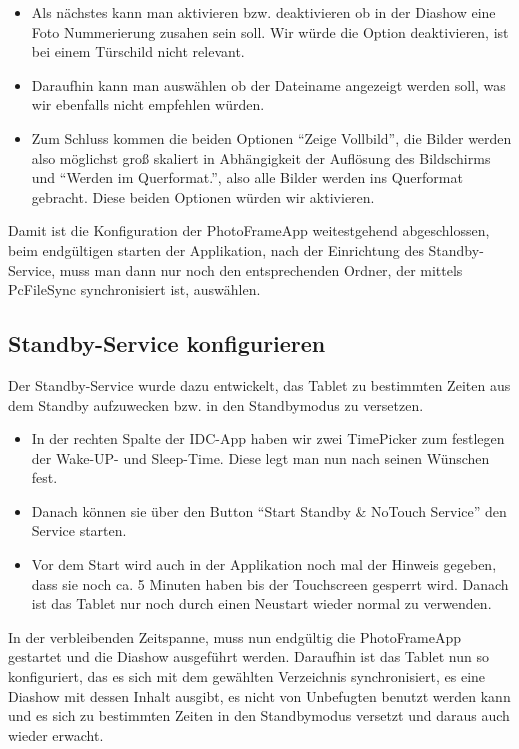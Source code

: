 \begin{flushleft}
\begin{itemize}
\begin{itemize}
        \item Als nächstes kann man aktivieren bzw. deaktivieren ob in der Diashow eine Foto Nummerierung zusahen sein soll. Wir würde die Option deaktivieren, ist bei einem Türschild nicht relevant.
        \item Daraufhin kann man auswählen ob der Dateiname angezeigt werden soll, was wir ebenfalls nicht empfehlen würden.
        \item Zum Schluss kommen die beiden Optionen ``Zeige Vollbild'', die Bilder werden also möglichst groß skaliert in Abhängigkeit der Auflösung des Bildschirms und ``Werden im Querformat.'', also alle Bilder werden ins Querformat gebracht. Diese beiden Optionen würden wir aktivieren.
      \end{itemize}
    \end{itemize}
    Damit ist die Konfiguration der PhotoFrameApp weitestgehend abgeschlossen, beim endgültigen starten der Applikation, nach der Einrichtung des Standby-Service, muss man dann nur noch den entsprechenden Ordner, der mittels PcFileSync synchronisiert ist, auswählen.
  \subsection{Standby-Service konfigurieren}
    Der Standby-Service wurde dazu entwickelt, das Tablet zu bestimmten Zeiten aus dem Standby aufzuwecken bzw. in den Standbymodus zu versetzen.
    \begin{itemize}
      \item In der rechten Spalte der IDC-App haben wir zwei TimePicker zum festlegen der Wake-UP- und Sleep-Time. Diese legt man nun nach seinen Wünschen fest.
      \item Danach können sie über den Button ``Start Standby \& NoTouch Service'' den Service starten.
      \item Vor dem Start wird auch in der Applikation noch mal der Hinweis gegeben, dass sie noch ca. 5 Minuten haben bis der Touchscreen gesperrt wird. Danach ist das Tablet nur noch durch einen Neustart wieder normal zu verwenden.
    \end{itemize}
    In der verbleibenden Zeitspanne, muss nun endgültig die PhotoFrameApp gestartet und die Diashow ausgeführt werden. Daraufhin ist das Tablet nun so konfiguriert, das es sich mit dem gewählten Verzeichnis synchronisiert, es eine Diashow mit dessen Inhalt ausgibt, es nicht von Unbefugten benutzt werden kann und es sich zu bestimmten Zeiten in den Standbymodus versetzt und daraus auch wieder erwacht.
\end{flushleft}
